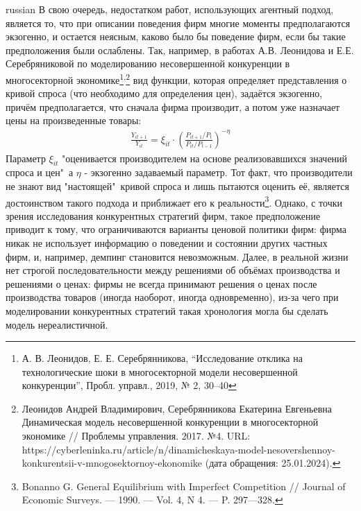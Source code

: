 \documentclass[9pt]{article}
\begin{document}
\begin{otherlanguage*}{russian}
В свою очередь, недостатком работ, использующих агентный подход, является то, что при описании поведения фирм многие моменты предполагаются экзогенно, и остается неясным, каково было бы поведение фирм, если бы такие предположения были ослаблены.
Так, например, в работах А.В. Леонидова и Е.Е. Серебряниковой по моделированию несовершенной конкуренции в многосекторной экономике\footnote{	А. В. Леонидов, Е. Е. Серебрянникова, “Исследование отклика на технологические шоки в многосекторной модели несовершенной конкуренции”, Пробл. управл., 2019, № 2, 30–40}\textsuperscript{,}\footnote{Леонидов Андрей Владимирович, Серебрянникова Екатерина Евгеньевна Динамическая модель несовершенной конкуренции в многосекторной экономике // Проблемы управления. 2017. №4. URL: https://cyberleninka.ru/article/n/dinamicheskaya-model-nesovershennoy-konkurentsii-v-mnogosektornoy-ekonomike (дата обращения: 25.01.2024).}
вид функции, которая определяет представления о кривой спроса (что необходимо для определения цен), задаётся экзогенно, причём предполагается, что сначала фирма производит, а потом уже назначает цены на произведенные товары: 
\begin{align*}
	\frac{Y_{it+1}}{Y_{it}} = \xi_{it} \cdot \left( \frac{P_{it+1} / P_t}{P_{it} / P_{t-1}}\right)^{-\eta}
\end{align*}
Параметр $\xi_{it}$ "оценивается производителем на основе реализовавшихся значений спроса и цен"\, а $\eta$ - экзогенно задаваемый параметр. Тот факт, что производители не знают вид "настоящей"\ кривой спроса и лишь пытаются оценить её, является достоинством такого подхода и приближает его к реальности\footnote{Bonanno G. General Equilibrium with Imperfect Competition // Journal of Economic Surveys. — 1990. — Vol. 4, N 4. — P. 297—328.}. Однако, с точки зрения исследования конкурентных стратегий фирм, такое предположение приводит к тому, что ограничиваются варианты ценовой политики фирм: фирма никак не использует информацию о поведении и состоянии других частных фирм, и, например, демпинг становится невозможным. Далее, в реальной жизни нет строгой последовательности между решениями об объёмах производства и решениями о ценах: фирмы не всегда принимают решения о ценах после производства товаров (иногда наоборот, иногда одновременно), из-за чего при моделировании конкурентных стратегий такая хронология могла бы сделать модель нереалистичной.


\end{otherlanguage*}
\end{document}
